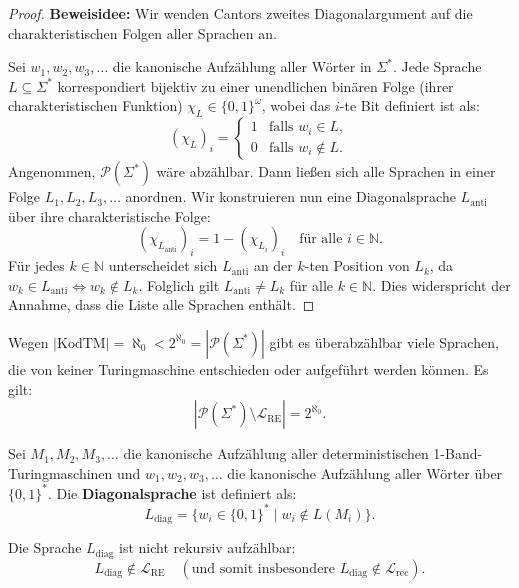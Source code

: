 \begin{proof}
    \textbf{Beweisidee:} Wir wenden Cantors zweites Diagonalargument auf die charakteristischen Folgen aller Sprachen an.
    
    Sei $w_1, w_2, w_3, \dots$ die kanonische Aufzählung aller Wörter in $\Sigma^*$. Jede Sprache $L \subseteq \Sigma^*$ korrespondiert bijektiv zu einer unendlichen binären Folge (ihrer charakteristischen Funktion) $\chi_L \in \{0, 1\}^\omega$, wobei das $i$-te Bit definiert ist als:
    \[
        (\chi_L)_i = \begin{cases} 1 & \text{falls } w_i \in L, \\ 0 & \text{falls } w_i \notin L. \end{cases}
    \]
    Angenommen, $\mathcal{P}(\Sigma^*)$ wäre abzählbar. Dann ließen sich alle Sprachen in einer Folge $L_1, L_2, L_3, \dots$ anordnen. Wir konstruieren nun eine Diagonalsprache $L_{\mathrm{anti}}$ über ihre charakteristische Folge:
    \[
        (\chi_{L_{\mathrm{anti}}})_i = 1 - (\chi_{L_i})_i \quad \text{für alle } i \in \mathbb{N}.
    \]
    Für jedes $k \in \mathbb{N}$ unterscheidet sich $L_{\mathrm{anti}}$ an der $k$-ten Position von $L_k$, da $w_k \in L_{\mathrm{anti}} \iff w_k \notin L_k$. Folglich gilt $L_{\mathrm{anti}} \neq L_k$ für alle $k \in \mathbb{N}$. Dies widerspricht der Annahme, dass die Liste alle Sprachen enthält.
\end{proof}

\begin{theorem}
    Wegen $|\mathrm{KodTM}| = \aleph_0 < 2^{\aleph_0} = |\mathcal{P}(\Sigma^*)|$ gibt es überabzählbar viele Sprachen, die von keiner Turingmaschine entschieden oder aufgeführt werden können. Es gilt:
    \[
        |\mathcal{P}(\Sigma^*) \setminus \mathcal{L}_{\mathrm{RE}}| = 2^{\aleph_0}.
    \]
\end{theorem}

\begin{definition}
    Sei $M_1, M_2, M_3, \dots$ die kanonische Aufzählung aller deterministischen 1-Band-Turingmaschinen und $w_1, w_2, w_3, \dots$ die kanonische Aufzählung aller Wörter über $\{0, 1\}^*$. Die \textbf{Diagonalsprache} ist definiert als:
    \[
        L_{\mathrm{diag}} = \{w_i \in \{0, 1\}^* \mid w_i \notin L(M_i)\}.
    \]
\end{definition}

\begin{theorem}
    Die Sprache $L_{\mathrm{diag}}$ ist nicht rekursiv aufzählbar:
    \[
        L_{\mathrm{diag}} \notin \mathcal{L}_{\mathrm{RE}} \quad (\text{und somit insbesondere } L_{\mathrm{diag}} \notin \mathcal{L}_{\mathrm{rec}}).
    \]
\end{theorem}

